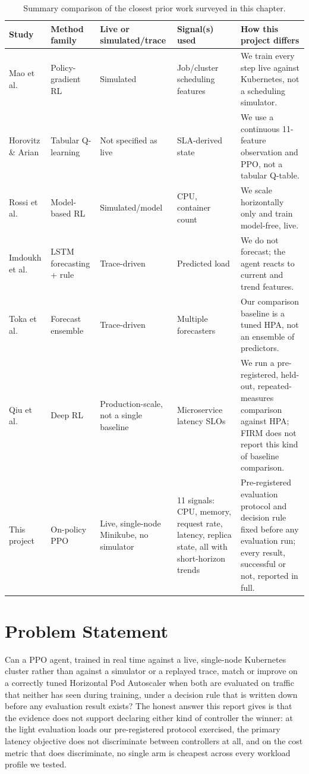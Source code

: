 \begin{table}[H]
\centering
\caption[Comparison with closest prior work]{Summary comparison of the closest prior work surveyed in this chapter.}
\label{tab:related-work-summary}
\small
\begin{tabular}{p{2.6cm}p{2.6cm}p{2.3cm}p{2.3cm}p{3.5cm}}
\toprule
Study & Method family & Live or simulated/trace & Signal(s) used & How this project differs \\
\midrule
Mao et al.\ \cite{mao2016resource} & Policy-gradient RL & Simulated & Job/cluster scheduling features & We train every step live against Kubernetes, not a scheduling simulator. \\
Horovitz \& Arian \cite{horovitz2018qlearning} & Tabular Q-learning & Not specified as live & SLA-derived state & We use a continuous 11-feature observation and PPO, not a tabular Q-table. \\
Rossi et al.\ \cite{rossi2019horizontal} & Model-based RL & Simulated/model & CPU, container count & We scale horizontally only and train model-free, live. \\
Imdoukh et al.\ \cite{imdoukh2020lstm} & LSTM forecasting + rule & Trace-driven & Predicted load & We do not forecast; the agent reacts to current and trend features. \\
Toka et al.\ \cite{toka2021edge} & Forecast ensemble & Trace-driven & Multiple forecasters & Our comparison baseline is a tuned HPA, not an ensemble of predictors. \\
Qiu et al.\ \cite{qiu2020firm} & Deep RL & Production-scale, not a single baseline & Microservice latency SLOs & We run a pre-registered, held-out, repeated-measures comparison against HPA; FIRM does not report this kind of baseline comparison. \\
This project & On-policy PPO & Live, single-node Minikube, no simulator & 11 signals: CPU, memory, request rate, latency, replica state, all with short-horizon trends & Pre-registered evaluation protocol and decision rule fixed before any evaluation run; every result, successful or not, reported in full. \\
\bottomrule
\end{tabular}
\end{table}

\section{Problem Statement}
\label{sec:problem-statement}

Can a PPO agent, trained in real time against a live, single-node Kubernetes
cluster rather than against a simulator or a replayed trace, match or
improve on a correctly tuned Horizontal Pod Autoscaler when both are
evaluated on traffic that neither has seen during training, under a
decision rule that is written down before any evaluation result exists? The
honest answer this report gives is that the evidence does not support
declaring either kind of controller the winner: at the light evaluation
loads our pre-registered protocol exercised, the primary latency objective
does not discriminate between controllers at all, and on the cost metric
that does discriminate, no single arm is cheapest across every workload
profile we tested.

